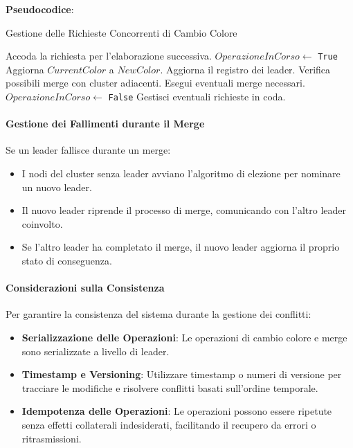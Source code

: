 \documentclass[12pt, a4paper]{report}
\begin{document}
\textbf{Pseudocodice}:

\begin{algorithm}[H]
\caption{Gestione delle Richieste Concorrenti di Cambio Colore}
\begin{algorithmic}[1]
        \State Accoda la richiesta per l'elaborazione successiva.
    \Else
        \State $OperazioneInCorso \gets$ \texttt{True}
            \State Aggiorna $CurrentColor$ a $NewColor$.
            \State Aggiorna il registro dei leader.
            \State Verifica possibili merge con cluster adiacenti.
            \State Esegui eventuali merge necessari.
        \EndIf
        \State $OperazioneInCorso \gets$ \texttt{False}
        \State Gestisci eventuali richieste in coda.
    \EndIf
\EndProcedure
\end{algorithmic}
\end{algorithm}

\paragraph{Gestione dei Fallimenti durante il Merge}

Se un leader fallisce durante un merge:

\begin{itemize}
    \item I nodi del cluster senza leader avviano l'algoritmo di elezione per nominare un nuovo leader.
    \item Il nuovo leader riprende il processo di merge, comunicando con l'altro leader coinvolto.
    \item Se l'altro leader ha completato il merge, il nuovo leader aggiorna il proprio stato di conseguenza.
\end{itemize}

\paragraph{Considerazioni sulla Consistenza}

Per garantire la consistenza del sistema durante la gestione dei conflitti:

\begin{itemize}
    \item \textbf{Serializzazione delle Operazioni}: Le operazioni di cambio colore e merge sono serializzate a livello di leader.
    \item \textbf{Timestamp e Versioning}: Utilizzare timestamp o numeri di versione per tracciare le modifiche e risolvere conflitti basati sull'ordine temporale.
    \item \textbf{Idempotenza delle Operazioni}: Le operazioni possono essere ripetute senza effetti collaterali indesiderati, facilitando il recupero da errori o ritrasmissioni.
\end{itemize}
\end{document}
